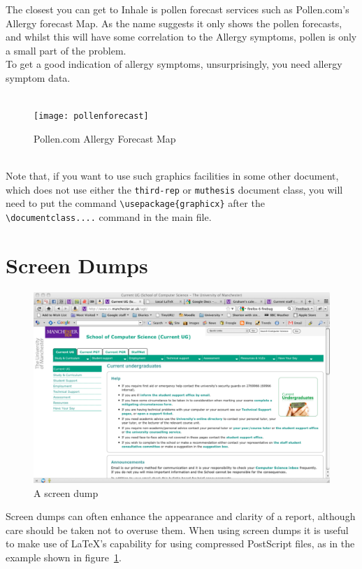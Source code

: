 The closest you can get to Inhale is pollen forecast services such as Pollen.com's Allergy forecast Map. As the name suggests it only shows the pollen forecasts, and whilst this will have some correlation to the Allergy symptoms, pollen is only a small part of the problem.\\

To get a good indication of allergy symptoms, unsurprisingly, you need allergy symptom data.\\

\begin{figure}
\caption{Pollen.com Allergy Forecast Map}\\
\centering
\texttt{[image: pollenforecast]}
\centering
\end{figure}\\


Note that, if you want to use such graphics facilities in some other
document, which does not use either the \texttt{third-rep} or
\texttt{muthesis} document class, you will need to put the command
\verb=\usepackage{graphicx}= after the \verb=\documentclass....=
command in the main file.

\section{Screen Dumps}
\label{sec:screen-dumps}
\begin{figure}
\begin{center}
\includegraphics[width=12cm]{screen}
\end{center}
\caption{A screen dump}
\label{fig:scr-dump}
\end{figure}

Screen dumps can often enhance the appearance and clarity of a report,
although care should be taken not to overuse them. When using screen
dumps it is useful to make use of \LaTeX's capability for using
compressed PostScript files, as in the example shown in
figure~\ref{fig:scr-dump}. 

